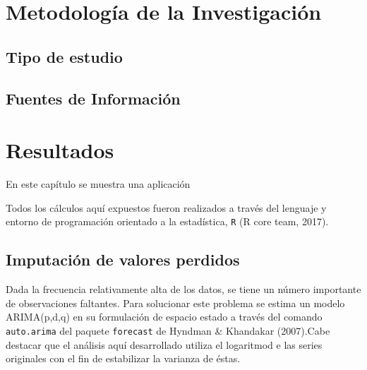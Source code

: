 \documentclass[12pt, twoside]{book}\usepackage[]{graphicx}\usepackage[]{color}
\numberwithin{equation}{section}
\numberwithin{theorem}{section}
\numberwithin{teorema}{section}
\numberwithin{defi}{section}
\numberwithin{prop}{section}
\numberwithin{defi}{section}
\theoremstyle{plain}
\begin{document}
\chapter{Metodología de la Investigación}
\section{Tipo de estudio}
\section{Fuentes de Información}




\chapter{Resultados}

En este capítulo se muestra una aplicación

Todos los cálculos aquí expuestos fueron realizados a través del lenguaje y entorno de programación orientado a la estadística, \texttt{R} (R core team, 2017).

\section{Imputación de valores perdidos}


Dada la frecuencia relativamente alta de los datos, se tiene un número importante de observaciones faltantes. Para solucionar este problema se estima un modelo ARIMA(p,d,q) en su formulación de espacio estado a través del comando \texttt{auto.arima} del paquete \texttt{forecast} de Hyndman \& Khandakar (2007).Cabe destacar que el análisis aquí desarrollado utiliza el logaritmod e las series originales con el fin de estabilizar la varianza de éstas.
\end{document}

